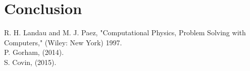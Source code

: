 \documentclass[11pt]{article}
\begin{document}
\section{Conclusion}





\setlength{\parindent}{0cm}

\begin{thebibliography}{99}  %

 R. H. Landau and M. J. Paez, "Computational Physics, Problem Solving with Computers,"
(Wiley: New York) 1997.
\\
 P. Gorham, (2014).
\\
 S. Covin, (2015).



\end{thebibliography}
\end{document}
